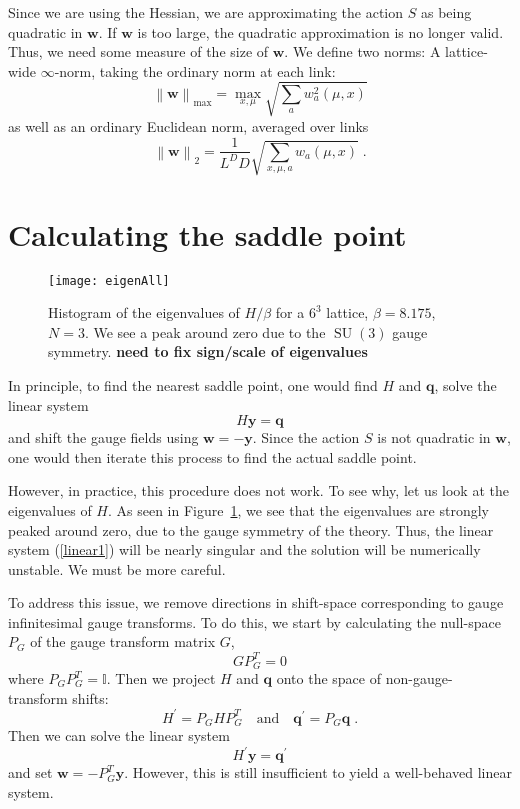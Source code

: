 \documentclass[preprint,aps,prd]{revtex4-2}
\newcommand{\be}{\begin{equation}}
\newcommand{\eq}{\end{equation}}
\DeclareMathOperator{\SU}{SU}
\begin{document}
Since we are using the Hessian, we are approximating
the action $S$ as being quadratic in $\mathbf{w}$.  If $\mathbf{w}$
is too large, the quadratic approximation is no longer valid.
Thus, we need some measure of the size of $\mathbf{w}$.
We define two norms:
A lattice-wide $\infty$-norm, taking the ordinary norm at each link:
\be
\left\lVert \mathbf{w}\right\rVert_{\mathrm{max}} =
     \max_{x,\mu} \sqrt{\sum_a w_a^2(\mu, x)}
\eq
as well as an ordinary Euclidean norm, averaged over links
\be
\left\lVert \mathbf{w}\right\rVert_2 =
     \frac{1}{L^D D}\sqrt{\sum_{x, \mu, a} w_a(\mu, x)}
        \; .
\eq



\section{Calculating the saddle point}
\label{saddle}

\begin{figure}
\texttt{[image: eigenAll]}
\caption{Histogram of the eigenvalues of $H/\beta$ for a $6^3$ lattice,
  $\beta = 8.175$, $N=3$.  We see a peak around zero due to the
  $\SU(3)$ gauge symmetry.
  {\bf need to fix sign/scale of eigenvalues} \label{eigenAll}}
\end{figure}

In principle, to find the nearest saddle point, one would
find $H$ and $\mathbf{q}$, solve the linear system
\be
    H \mathbf{y} = \mathbf{q} \label{linear1}
\eq
and shift the gauge fields using $\mathbf{w} = -\mathbf{y}$.
Since the action $S$ is not quadratic in $\mathbf{w}$, one
would then iterate this process to find the actual saddle point.

However, in practice, this procedure does not work.  To see why, let us
look at the eigenvalues of $H$.  As seen in Figure~\ref{eigenAll},
we see that the eigenvalues are strongly peaked around zero,
due to the gauge symmetry of the theory.  Thus, the linear
system (\ref{linear1}) will be nearly singular and
the solution will be numerically unstable.  We must be more careful.

To address this issue, we remove directions in shift-space corresponding
to gauge infinitesimal gauge transforms.  To do this, we start
by calculating the null-space $P_G$ of the gauge transform matrix $G$,
\be
G P_G^T = 0
\eq
where $P_G P_G^T = \mathbb{I}$.  Then we project $H$ and $\mathbf{q}$ onto
the space of non-gauge-transform shifts:
\be
         H^\prime = P_G H P_G^T \quad \mbox{and} \quad
         \mathbf{q}^\prime = P_G \mathbf{q} \; .
\eq
Then we can solve the linear system
\be
   H^\prime \mathbf{y} = \mathbf{q}^\prime \label{linear2}
\eq
and set $\mathbf{w} = - P_G^T \mathbf{y}$.  However, this is
still insufficient to yield a well-behaved linear system.
\end{document}
